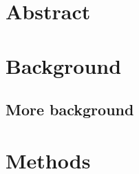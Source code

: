 
\newcommand{\assignmenttype}{Assignment}
\newcommand{\assignmentnumber}{0}
\newcommand{\assignmenttitle}{Path Planning Example}
\newcommand{\assignmentdue}{2021-01-01}
\newcommand{\assignmentabstract}{\lipsum[2]}




\section{Abstract}

\lipsum[1]

\section{Background}

\lipsum[2]

\subsection{More background}

\lipsum[3]

\section{Methods}

\lipsum[4]







